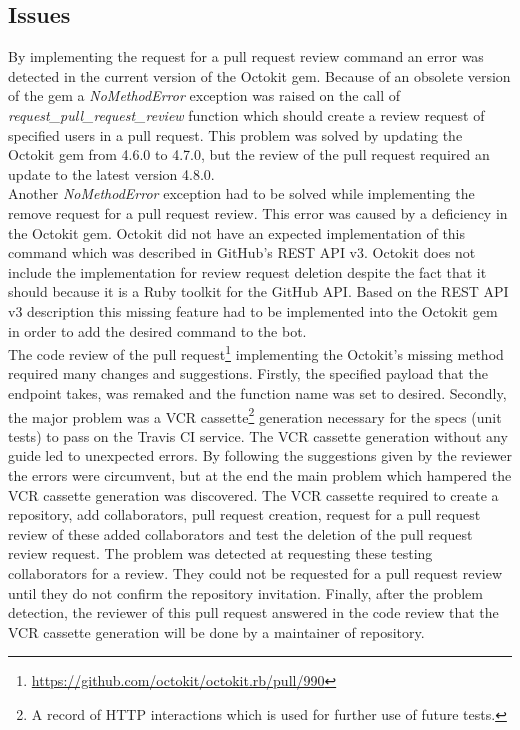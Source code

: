 \subsection{Issues}

By implementing the request for a pull request review command an error was detected in the current version of the Octokit gem. Because of an obsolete version of the gem a \textit{NoMethodError} exception was raised on the call of \textit{request\_pull\_request\_review} function which should create a review request of specified users in a pull request. This problem was solved by updating the Octokit gem from 4.6.0 to 4.7.0, but the review of the pull request required an update to the latest version 4.8.0.\\

Another \textit{NoMethodError} exception had to be solved while implementing the remove request for a pull request review. This error was caused by a deficiency in the Octokit gem. Octokit did not have an expected implementation of this command which was described in GitHub’s REST API v3. Octokit does not include the implementation for review request deletion despite the fact that it should because it is a Ruby toolkit for the GitHub API. Based on the REST API v3 description this missing feature had to be implemented into the Octokit gem in order to add the desired command to the bot.\\

The code review of the pull request\footnote{\url{https://github.com/octokit/octokit.rb/pull/990}} implementing the Octokit's missing method required many changes and suggestions. Firstly, the specified payload that the endpoint takes, was remaked and the function name was set to desired. Secondly, the major problem was a VCR cassette\footnote{A record of HTTP interactions which is used for further use of future tests.} generation necessary for the specs (unit tests) to pass on the Travis CI service. The VCR cassette generation without any guide led to unexpected errors. By following the suggestions given by the reviewer the errors were circumvent, but at the end the main problem which hampered the VCR cassette generation was discovered. The VCR cassette required to create a repository, add collaborators, pull request creation, request for a pull request review of these added collaborators and test the deletion of the pull request review request. The problem was detected at requesting these testing collaborators for a review. They could not be requested for a pull request review until they do not confirm the repository invitation. Finally, after the problem detection, the reviewer of this pull request answered in the code review that the VCR cassette generation will be done by a maintainer of repository.\\

